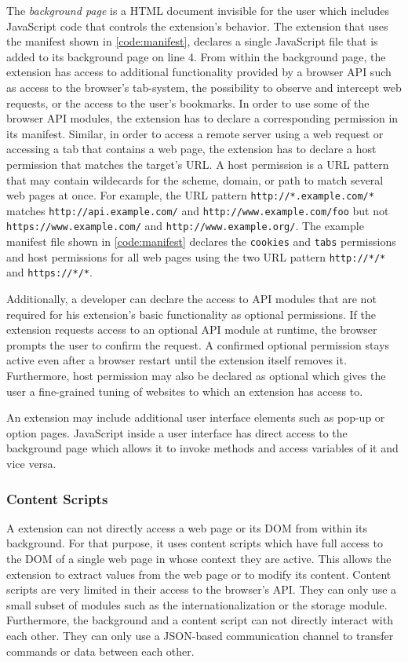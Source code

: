 	The \textit{background page} is a HTML document invisible for the user which includes JavaScript code that controls the extension's behavior. The extension that uses the manifest shown in \autoref{code:manifest}, declares a single JavaScript file that is added to its background page on line 4. From within the background page, the extension has access to additional functionality provided by a browser API such as access to the browser's tab-system, the possibility to observe and intercept web requests, or the access to the user's bookmarks. In order to use some of the browser API modules, the extension has to declare a corresponding permission in its manifest. Similar, in order to access a remote server using a web request or accessing a tab that contains a web page, the extension has to declare a host permission that matches the target's URL. A host permission is a URL pattern that may contain wildecards for the scheme, domain, or path to match several web pages at once. For example, the URL pattern \texttt{http://*.example.com/*} matches \texttt{http://api.example.com/} and \texttt{http://www.example.com/foo} but not \texttt{https://www.example.com/} and \texttt{http://www.example.org/}. The example manifest file shown in \autoref{code:manifest} declares the \texttt{cookies} and \texttt{tabs} permissions and host permissions for all web pages using the two URL pattern \texttt{http://*/*} and \texttt{https://*/*}.	
	
	Additionally, a developer can declare the access to API modules that are not required for his extension's basic functionality as optional permissions. If the extension requests access to an optional API module at runtime, the browser prompts the user to confirm the request. A confirmed optional permission stays active even after a browser restart until the extension itself removes it. Furthermore, host permission may also be declared as optional which gives the user a fine-grained tuning of websites to which an extension has access to. 
	
	An extension may include additional user interface elements such as pop-up or option pages. JavaScript inside a user interface has direct access to the background page which allows it to invoke methods and access variables of it and vice versa. 
	
\subsubsection{Content Scripts}
	
	A extension can not directly access a web page or its DOM from within its background. For that purpose, it uses content scripts which have full access to the DOM of a single web page in whose context they are active. This allows the extension to extract values from the web page or to modify its content. Content scripts are very limited in their access to the browser's API. They can only use a small subset of modules such as the internationalization or the storage module. Furthermore, the background and a content script can not directly interact with each other. They can only use a JSON-based communication channel to transfer commands or data between each other. 
	
